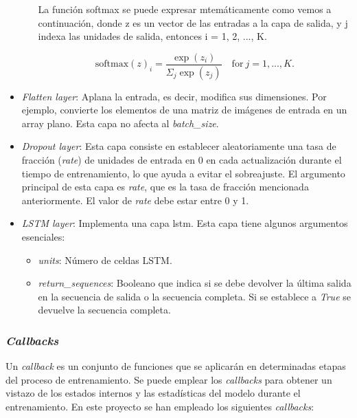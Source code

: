 \begin{itemize}
\begin{itemize}
            La función softmax se puede expresar mtemáticamente como vemos a continuación, donde z es un vector de las entradas a la capa de salida, y j indexa las unidades de salida, entonces i = 1, 2, ..., K.
            
            \begin{equation}\label{eq:SoftMax}
		        \mathrm{softmax}(z)_i=\frac{\exp(z_i)}{\Sigma_{j}{\exp(z_j)}} \quad \mathrm{for} \ j=1, ...,K.
            \end{equation}
        \end{itemize}
    
    \item \textit{Flatten layer}: Aplana la entrada, es decir, modifica sus dimensiones. Por ejemplo, convierte los elementos de una matriz de imágenes de entrada en un array plano. Esta capa no afecta al \textit{batch\_size}.
    
    \item \textit{Dropout layer}: Esta capa consiste en establecer aleatoriamente una tasa de fracción (\textit{rate}) de unidades de entrada en 0 en cada actualización durante el tiempo de entrenamiento, lo que ayuda a evitar el sobreajuste. El argumento principal de esta capa es \textit{rate}, que es la tasa de fracción mencionada anteriormente. El valor de \textit{rate} debe estar entre 0 y 1.

    
    \item \textit{LSTM layer}: Implementa una capa \acrfull{lstm}. Esta capa tiene algunos argumentos esenciales:
    
        \begin{itemize}
            \item \textit{units}: Número de celdas LSTM.
            
            \item \textit{return\_sequences}: Booleano que indica si se debe devolver la última salida en la secuencia de salida o la secuencia completa. Si se establece a \textit{True} se devuelve la secuencia completa.
        \end{itemize}
\end{itemize}


\subsubsection{\textit{Callbacks}} \label{callback}

Un \textit{callback} es un conjunto de funciones que se aplicarán en determinadas etapas del proceso de entrenamiento. Se puede emplear los \textit{callbacks} para obtener un vistazo de los estados internos y las estadísticas del modelo durante el entrenamiento. En este proyecto se han empleado los siguientes \textit{callbacks}:

